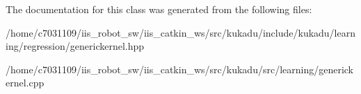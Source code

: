 The documentation for this class was generated from the following files\-:\begin{DoxyCompactItemize}
\item 
/home/c7031109/iis\-\_\-robot\-\_\-sw/iis\-\_\-catkin\-\_\-ws/src/kukadu/include/kukadu/learning/regression/generickernel.\-hpp\item 
/home/c7031109/iis\-\_\-robot\-\_\-sw/iis\-\_\-catkin\-\_\-ws/src/kukadu/src/learning/generickernel.\-cpp\end{DoxyCompactItemize}

